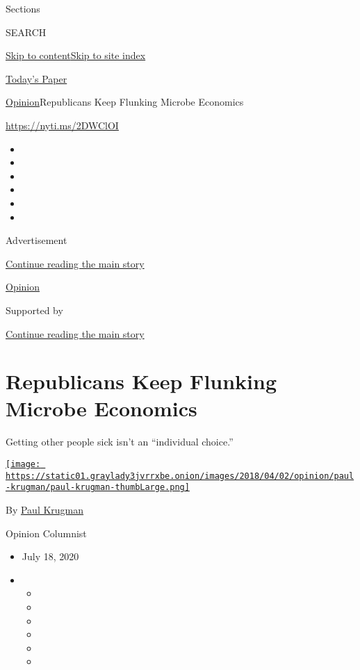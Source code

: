 Sections

SEARCH

\protect\hyperlink{site-content}{Skip to
content}\protect\hyperlink{site-index}{Skip to site index}

\href{https://myaccount.nytimes3xbfgragh.onion/auth/login?response_type=cookie\&client_id=vi}{}

\href{https://www.nytimes3xbfgragh.onion/section/todayspaper}{Today's
Paper}

\href{/section/opinion}{Opinion}\textbar{}Republicans Keep Flunking
Microbe Economics

\href{https://nyti.ms/2DWClOI}{https://nyti.ms/2DWClOI}

\begin{itemize}
\item
\item
\item
\item
\item
\item
\end{itemize}

Advertisement

\protect\hyperlink{after-top}{Continue reading the main story}

\href{/section/opinion}{Opinion}

Supported by

\protect\hyperlink{after-sponsor}{Continue reading the main story}

\hypertarget{republicans-keep-flunking-microbe-economics}{%
\section{Republicans Keep Flunking Microbe
Economics}\label{republicans-keep-flunking-microbe-economics}}

Getting other people sick isn't an ``individual choice.''

\href{https://www.nytimes3xbfgragh.onion/by/paul-krugman}{\texttt{[image: https://static01.graylady3jvrrxbe.onion/images/2018/04/02/opinion/paul-krugman/paul-krugman-thumbLarge.png]}}

By \href{https://www.nytimes3xbfgragh.onion/by/paul-krugman}{Paul
Krugman}

Opinion Columnist

\begin{itemize}
\item
  July 18, 2020
\item
  \begin{itemize}
  \item
  \item
  \item
  \item
  \item
  \item
  \end{itemize}
\end{itemize}

